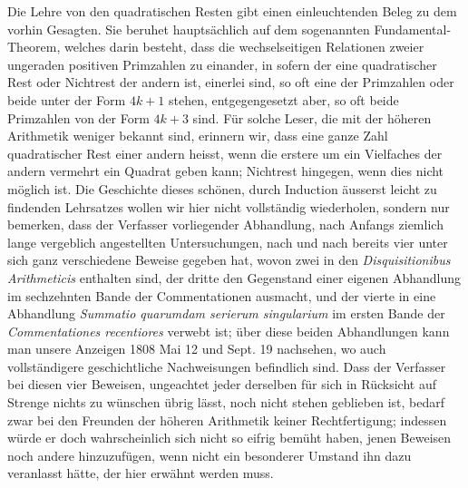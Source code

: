 \documentclass[12pt]{article}
\begin{document}
Die Lehre von den quadratischen Resten gibt einen einleuchtenden Beleg zu dem vorhin Gesagten. Sie beruhet hauptsächlich auf dem sogenannten Fundamental-Theorem, welches darin besteht, dass die wechselseitigen Relationen zweier ungeraden positiven Primzahlen zu einander, in sofern der eine quadratischer Rest oder Nichtrest der andern ist, einerlei sind, so oft eine der Primzahlen oder beide unter der Form $4k+1$ stehen, entgegengesetzt aber, so oft beide Primzahlen von der Form $4k+3$ sind. Für solche Leser, die mit der höheren Arithmetik weniger bekannt sind, erinnern wir, dass eine ganze Zahl quadratischer Rest einer andern heisst, wenn die erstere um ein Vielfaches der andern vermehrt ein Quadrat geben kann; Nichtrest hingegen, wenn dies nicht möglich ist. Die Geschichte dieses schönen, durch Induction äusserst leicht zu findenden Lehrsatzes wollen wir hier nicht vollständig wiederholen, sondern nur bemerken, dass der Verfasser vorliegender Abhandlung, nach Anfangs ziemlich lange vergeblich angestellten Untersuchungen, nach und nach bereits vier unter sich ganz verschiedene Beweise gegeben hat, wovon zwei in den \textit{Disquisitionibus Arithmeticis} enthalten sind, der dritte den Gegenstand einer eigenen Abhandlung im sechzehnten Bande der Commentationen ausmacht, und der vierte in eine Abhandlung \textit{Summatio quarumdam serierum singularium} im ersten Bande der \textit{Commentationes recentiores} verwebt ist; über diese beiden Abhandlungen kann man unsere Anzeigen 1808 Mai 12 und Sept. 19 nachsehen, wo auch vollständigere geschichtliche Nachweisungen befindlich sind. Dass der Verfasser bei diesen vier Beweisen, ungeachtet jeder derselben für sich in Rücksicht auf Strenge nichts zu wünschen übrig lässt, noch nicht stehen geblieben ist, bedarf zwar bei den Freunden der höheren Arithmetik keiner Rechtfertigung; indessen würde er doch wahrscheinlich sich nicht so eifrig bemüht haben, jenen Beweisen noch andere hinzuzufügen, wenn nicht ein besonderer Umstand ihn dazu veranlasst hätte, der hier erwähnt werden muss.
\end{document}
